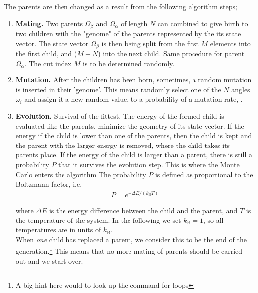 \documentclass{article}
\begin{document}
The parents are then changed as a result from the following algorithm steps;

\begin{enumerate}

    \item {\bf Mating.}\newline
        Two parents $\Omega_\beta$ and $\Omega_\alpha$ of length $N$ can combined to give birth to two children with the "genome" of the parents represented by the its state vector.
        The state vector $\Omega_\beta$ is then being split from the first $M$ elements into the first child, and ($M-N$) into the next child.
        Same procedure for parent $\Omega_\alpha$.
        The cut index $M$ is to be determined randomly.

    \item {\bf Mutation.}\newline
        After the children has been born, sometimes, a random mutation is inserted in their 'genome'.
        This means randomly select one of the $N$ angles $\omega_i$ and assign it a new random value, to a probability of a mutation rate, .

    \item {\bf Evolution.} \newline
        Survival of the fittest.
        The energy of the formed child is evaluated like the parents, minimize the geometry of its state vector.
        If the energy if the child is lower than one of the parents, then the child is kept and the parent with the larger energy is removed, where the child takes its parents place.
        If the energy of the child is larger than a parent, there is still a probability $P$ that it survives the evolution step.      
        This is where the Monte Carlo enters the algorithm
        The probability $P$ is defined as proportional to the Boltzmann factor, i.e.
        \begin{align}
        P = e^{-\Delta E /(k_\mathrm{B}T)}
        \end{align}

        where $\Delta E$ is the energy difference between the child and the parent, and $T$ is the temperature of the system.
        In the following we set $k_\mathrm{B} = 1$, 
        so all temperatures are in units of  $k_\mathrm{B}$.\\

        When {\em one} child has replaced a parent, we consider this to be the end of the generation.\footnote{A big hint here would to look up the  command for loops}
        This means that no more mating of parents should be carried out and we start over. 

\end{enumerate}
\end{document}

